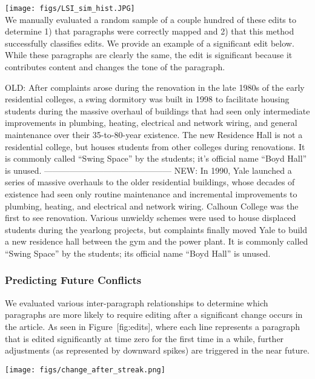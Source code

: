 \texttt{[image: figs/LSI\_sim\_hist.JPG]}\\

We manually evaluated a random sample of a couple hundred of these edits
to determine 1) that paragraphs were correctly mapped and 2) that this
method successfully classifies edits. We provide an example of a
significant edit below. While these paragraphs are clearly the same, the
edit is significant because it contributes content and changes the tone
of the paragraph.

OLD: After complaints arose during the renovation in the late 1980s of
the early residential colleges, a swing dormitory was built in 1998 to
facilitate housing students during the massive overhaul of buildings
that had seen only intermediate improvements in plumbing, heating,
electrical and network wiring, and general maintenance over their
35-to-80-year existence. The new Residence Hall is not a residential
college, but houses students from other colleges during renovations. It
is commonly called ``Swing Space'' by the students; it's official name
``Boyd Hall'' is unused. ---------------------------------------------
NEW: In 1990, Yale launched a series of massive overhauls to the older
residential buildings, whose decades of existence had seen only routine
maintenance and incremental improvements to plumbing, heating, and
electrical and network wiring. Calhoun College was the first to see
renovation. Various unwieldy schemes were used to house displaced
students during the yearlong projects, but complaints finally moved Yale
to build a new residence hall between the gym and the power plant. It is
commonly called ``Swing Space'' by the students; its official name
``Boyd Hall'' is unused.

\subsubsection{Predicting Future
Conflicts}\label{predicting-future-conflicts}

We evaluated various inter-paragraph relationships to determine which
paragraphs are more likely to require editing after a significant change
occurs in the article. As seen in Figure~{[}fig:edits{]}, where each
line represents a paragraph that is edited significantly at time zero
for the first time in a while, further adjustments (as represented by
downward spikes) are triggered in the near future.

\texttt{[image: figs/change\_after\_streak.png]}\\

